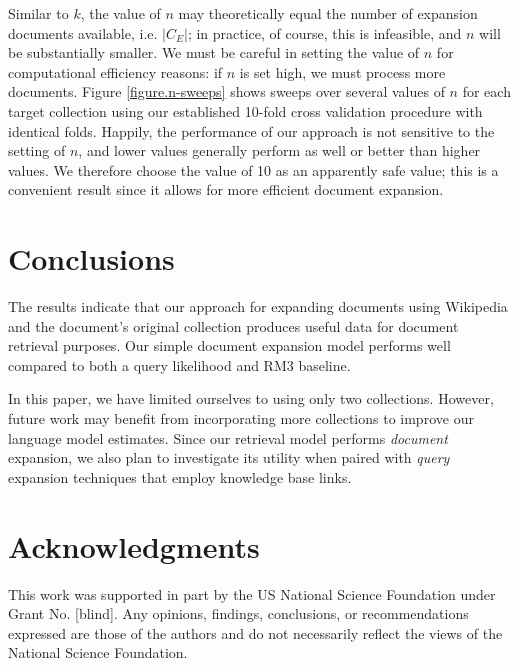 \documentclass{sig-alternate}
\begin{document}
Similar to $k$, the value of $n$ may theoretically equal the number of expansion documents available, i.e. $|C_E|$; in practice, of course, this is infeasible, and $n$ will be substantially smaller. We must be careful in setting the value of $n$ for computational efficiency reasons: if $n$ is set high, we must process more documents. Figure \ref{figure.n-sweeps} shows sweeps over several values of $n$ for each target collection using our established 10-fold cross validation procedure with identical folds. Happily, the performance of our approach is not sensitive to the setting of $n$, and lower values generally perform as well or better than higher values. We therefore choose the value of 10 as an apparently safe value; this is a convenient result since it allows for more efficient document expansion.


\section{Conclusions}\label{section.conclusions}

The results indicate that our approach for expanding documents using Wikipedia and the document's original collection produces useful data for document retrieval purposes. Our simple document expansion model performs well compared to both a query likelihood and RM3 baseline.

In this paper, we have limited ourselves to using only two collections. However, future work may benefit from incorporating more collections to improve our language model estimates. Since our retrieval model performs \textit{document} expansion, we also plan to investigate its utility when paired with \textit{query} expansion techniques that employ knowledge base links.

\section{Acknowledgments}\label{section.acknowledgments}
This work was supported in part by the US National Science Foundation under Grant No. [blind]. Any opinions, findings, conclusions, or recommendations expressed are those of the authors and do not necessarily reflect the views of the National Science Foundation.



  
\end{document}
